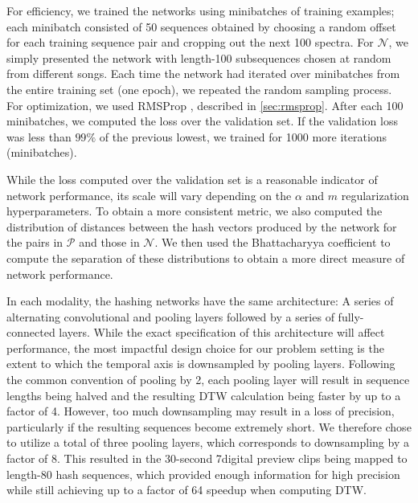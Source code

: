 For efficiency, we trained the networks using minibatches of training examples; each minibatch consisted of 50 sequences obtained by choosing a random offset for each training sequence pair and cropping out the next 100 spectra.
For $\mathcal{N}$, we simply presented the network with length-100 subsequences chosen at random from different songs.
Each time the network had iterated over minibatches from the entire training set (one epoch), we repeated the random sampling process.
For optimization, we used RMSProp \cite{tieleman2012lecture}, described in \cref{sec:rmsprop}.
After each 100 minibatches, we computed the loss over the validation set.
If the validation loss was less than $99\%$ of the previous lowest, we trained for 1000 more iterations (minibatches).

While the loss computed over the validation set is a reasonable indicator of network performance, its scale will vary depending on the $\alpha$ and $m$ regularization hyperparameters.
To obtain a more consistent metric, we also computed the distribution of distances between the hash vectors produced by the network for the pairs in $\mathcal{P}$ and those in $\mathcal{N}$.
We then used the Bhattacharyya coefficient \cite{bhattacharyya1943measure} to compute the separation of these distributions to obtain a more direct measure of network performance.

In each modality, the hashing networks have the same architecture: A series of alternating convolutional and pooling layers followed by a series of fully-connected layers.
While the exact specification of this architecture will affect performance, the most impactful design choice for our problem setting is the extent to which the temporal axis is downsampled by pooling layers.
Following the common convention of pooling by 2, each pooling layer will result in sequence lengths being halved and the resulting DTW calculation being faster by up to a factor of 4.
However, too much downsampling may result in a loss of precision, particularly if the resulting sequences become extremely short.
We therefore chose to utilize a total of three pooling layers, which corresponds to downsampling by a factor of 8.
This resulted in the 30-second 7digital preview clips being mapped to length-80 hash sequences, which provided enough information for high precision while still achieving up to a factor of 64 speedup when computing DTW.

